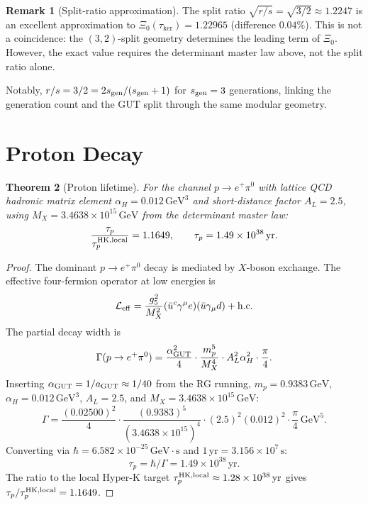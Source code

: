 \documentclass[12pt]{article}
\theoremstyle{plain}
\newtheorem{theorem}{Theorem}[section]
\theoremstyle{definition}
\newtheorem{remark}[theorem]{Remark}
\numberwithin{equation}{section}
\newcommand{\kker}{\mathrm{ker}}
\begin{document}
\begin{remark}[Split-ratio approximation]
The split ratio $\sqrt{r/s}=\sqrt{3/2}\approx1.2247$ is an excellent
approximation to $\Xi_0(\tau_{\kker})=1.22965$ (difference $0.04\%$).
This is not a coincidence: the $(3,2)$-split geometry determines the
leading term of $\Xi_0$.  However, the exact value requires the
determinant master law above, not the split ratio alone.

Notably, $r/s=3/2=2s_{\rm gen}/(s_{\rm gen}+1)$ for $s_{\rm gen}=3$
generations, linking the generation count and the GUT split through the
same modular geometry.
\end{remark}

\section{Proton Decay}\label{sec:protondecay}

\begin{theorem}[Proton lifetime]\label{thm:protondecay}
For the channel $p\to e^+\pi^0$ with lattice QCD hadronic matrix element
$\alpha_H=0.012\,\mathrm{GeV}^3$ and short-distance factor $A_L=2.5$,
using $M_X=3.4638\times10^{15}\,\mathrm{GeV}$ from the determinant master law:
\[
\frac{\tau_p}{\tau_p^{\rm HK,local}} = 1.1649,
\qquad
\tau_p = 1.49\times10^{38}\,\mathrm{yr}.
\]
\end{theorem}

\begin{proof}
The dominant $p\to e^+\pi^0$ decay is mediated by $X$-boson exchange.
The effective four-fermion operator at low energies is
\[
\mathcal{L}_{\rm eff} = \frac{g_5^2}{M_X^2}(\bar{u}^c\gamma^\mu e)(\bar{u}\gamma_\mu d) + \mathrm{h.c.}
\]
The partial decay width is
\[
\Gamma(p\to e^+\pi^0) = \frac{\alpha_{\rm GUT}^2}{4}\cdot\frac{m_p^5}{M_X^4}\cdot A_L^2\alpha_H^2\cdot\frac{\pi}{4}.
\]
Inserting $\alpha_{\rm GUT}=1/a_{\rm GUT}\approx1/40$ from the RG running,
$m_p=0.9383\,\mathrm{GeV}$, $\alpha_H=0.012\,\mathrm{GeV}^3$, $A_L=2.5$,
and $M_X=3.4638\times10^{15}\,\mathrm{GeV}$:
\[
\Gamma = \frac{(0.02500)^2}{4}\cdot\frac{(0.9383)^5}{(3.4638\times10^{15})^4}
\cdot(2.5)^2(0.012)^2\cdot\frac{\pi}{4}\,\mathrm{GeV}^5.
\]
Converting via $\hbar=6.582\times10^{-25}\,\mathrm{GeV}\cdot\mathrm{s}$ and $1\,\mathrm{yr}=3.156\times10^7\,\mathrm{s}$:
\[
\tau_p = \hbar/\Gamma = 1.49\times10^{38}\,\mathrm{yr}.
\]
The ratio to the local Hyper-K target $\tau_p^{\rm HK,local}\approx1.28\times10^{38}\,\mathrm{yr}$
gives $\tau_p/\tau_p^{\rm HK,local}=1.1649$.
\end{proof}
\end{document}

